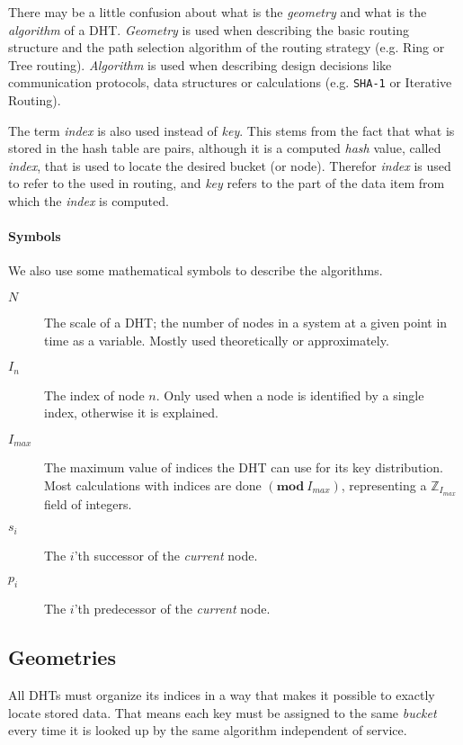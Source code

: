 There may be a little confusion about what is the \emph{geometry} and what is the
 \emph{algorithm} of a DHT.
 \emph{Geometry} is used when describing the basic routing structure
 and the path selection algorithm of the routing strategy (e.g. Ring or Tree routing).
 \emph{Algorithm} is used when describing design decisions like communication protocols,
 data structures or calculations (e.g. {\tt SHA-1} or Iterative Routing).

The term \emph{index} is also used instead of \emph{key}. This stems from the fact
 that what is stored in the hash table are  pairs, although it
 is a computed \emph{hash} value, called \emph{index}, that is used to locate the
 desired bucket (or node).
 Therefor \emph{index} is used to refer to the  used in
 routing, and \emph{key} refers to the part of the data item from which the
 \emph{index} is computed.

\paragraph{Symbols}

We also use some mathematical symbols to describe the algorithms.

\begin{description}
  \item[$N$] The scale of a DHT; the number of nodes in a system at a given point
     in time as a variable. Mostly used theoretically or approximately.
  \item[$I_n$] The index of node $n$. Only used when a node is identified by a single
     index, otherwise it is explained.
  \item[$I_{max}$]
     The maximum value of indices the DHT can use for its key distribution.
     Most calculations with indices are done $(\mathbf{mod\ }I_{max})$,
     representing a $\mathbb{Z}_{I_{max}}$ field of integers.
  \item[$s_i$] The $i$'th successor of the \emph{current} node.
  \item[$p_i$] The $i$'th predecessor of the \emph{current} node.
\end{description}




\subsection{Geometries}
\label{theory:Geometry}

All DHTs must organize its indices in a way that makes it possible to exactly
 locate stored data. That means each key must be assigned to the same
 \emph{bucket} every time it is looked up by the same algorithm independent of
 service.

